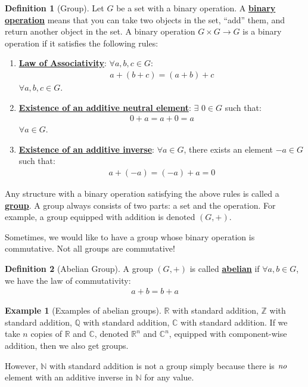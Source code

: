 \documentclass[11pt]{scrartcl}
\newcommand{\R}[0]{\mathbb{R}}
\theoremstyle{definition}
\newtheorem{definition}{Definition}
\newtheorem{ex}{Example}
\theoremstyle{remark}
\newcommand{\dfn}[1]{\textbf{\underline{#1}}}
\begin{document}
\begin{definition}[Group]
	Let $G$ be a set with a binary operation. A \dfn{binary operation} means that you can take two objects in the set, ``add'' them, and return another object in the set. A binary operation $G \times G \rightarrow G$ is a binary operation if it satisfies the following rules: 
	\begin{enumerate}[noitemsep]
		\item \dfn{Law of Associativity}: $\forall a,b,c \in G$: 
		\begin{align*}
			a + (b+c) = (a+b) + c	
		\end{align*}
		$\forall a,b,c \in G$. 
		\item \dfn{Existence of an additive neutral element}: $\exists$ $0 \in G$ such that:
		\begin{align*}
			0 + a = a + 0 = a 
		\end{align*}
		$ \forall a \in G$. 
		\item \dfn{Existence of an additive inverse}: $\forall a \in G$, there exists an element $-a \in G$ such that: 
		\begin{align}
			a + (-a) = (-a) + a = 0 
		\end{align}
	\end{enumerate}
	Any structure with a binary operation satisfying the above rules is called a \dfn{group}. A group always consists of two parts: a set and the operation. For example, a group equipped with addition is denoted $(G, +)$. 
\end{definition}
	Sometimes, we would like to have a group whose binary operation is commutative. Not all groups are commutative! 
\begin{definition}[Abelian Group]
A group $(G, +)$ is called \dfn{abelian} if $\forall a, b \in G$, we have the law of commutativity: 
	\begin{align*}
		a + b = b + a 	
	\end{align*}
\end{definition}

\begin{ex}[Examples of abelian groups] 
	$\R$ with standard addition, $\mathbb{Z}$ with standard addition, $\mathbb{Q}$ with standard addition, $\mathbb{C}$ with standard addition. If we take $n$ copies of $\R$ and $\mathbb{C}$, denoted $\R^n$ and $\mathbb{C}^n$, equipped with component-wise addition, then we also get groups. 
	
	
	
	However, $\mathbb{N}$ with standard addition is not a group simply because there is $\emph{no}$ element with an additive inverse in $\mathbb{N}$ for any value. 
\end{ex}
\end{document}
